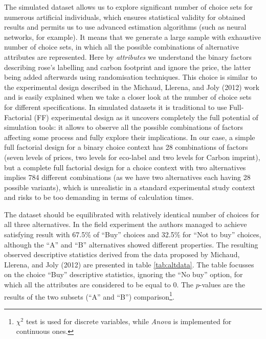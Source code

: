 \documentclass[12pt,]{article}
\let\rmarkdownfootnote\footnote%
\def\footnote{\protect\rmarkdownfootnote}
\begin{document}
The simulated dataset allows us to explore significant number of choice
sets for numerous artificial individuals, which ensures statistical
validity for obtained results and permits us to use advanced estimation
algorithms (such as neural networks, for example). It means that we
generate a large sample with exhaustive number of choice sets, in which
all the possible combinations of alternative attributes are represented.
Here by \emph{attributes} we understand the binary factors describing
rose's labelling and carbon footprint and ignore the price, the latter
being added afterwards using randomisation techniques. This choice is
similar to the experimental design described in the Michaud, Llerena,
and Joly (2012) work and is easily explained when we take a closer look
at the number of choice sets for different specifications. In simulated
datasets it is traditional to use Full-Factorial (FF) experimental
design as it uncovers completely the full potential of simulation tools:
it allows to observe all the possible combinations of factors affecting
some process and fully explore their implications. In our case, a simple
full factorial design for a binary choice context has 28 combinations of
factors (seven levels of prices, two levels for eco-label and two levels
for Carbon imprint), but a complete full factorial design for a choice
context with two alternatives implies 784 different combinations (as we
have two alternatives each having 28 possible variants), which is
unrealistic in a standard experimental study context and risks to be too
demanding in terms of calculation times.

The dataset should be equilibrated with relatively identical number of
choices for all three alternatives. In the field experiment the authors
managed to achieve satisfying result with 67.5\% of ``Buy'' choices and
32.5\% for ``Not to buy'' choices, although the ``A'' and ``B''
alternatives showed different properties. The resulting observed
descriptive statistics derived from the data proposed by Michaud,
Llerena, and Joly (2012) are presented in table \ref{tab:altdata}. The
table focusses on the choice ``Buy'' descriptive statistics, ignoring
the ``No buy'' option, for which all the attributes are considered to be
equal to 0. The \(p\)-values are the results of the two subsets (``A''
and ``B'') comparison\footnote{\(\chi^2\) test is used for discrete
  variables, while \emph{Anova} is implemented for continuous ones.}.
\end{document}

